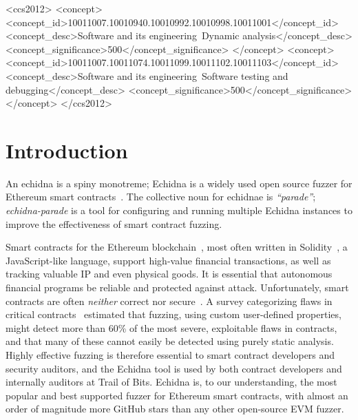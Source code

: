 \documentclass[sigconf]{acmart}
\begin{document}
\begin{CCSXML}
<ccs2012>
<concept>
<concept_id>10011007.10010940.10010992.10010998.10011001</concept_id>
<concept_desc>Software and its engineering~Dynamic analysis</concept_desc>
<concept_significance>500</concept_significance>
</concept>
<concept>
<concept_id>10011007.10011074.10011099.10011102.10011103</concept_id>
<concept_desc>Software and its engineering~Software testing and debugging</concept_desc>
<concept_significance>500</concept_significance>
</concept>
</ccs2012>
\end{CCSXML}




\maketitle

\section{Introduction}

An echidna is a spiny monotreme; Echidna is a widely used open source fuzzer for
Ethereum smart contracts~\cite{echidnaissta}.  The collective noun for
echidnae is \emph{``parade''}; \emph{echidna-parade} is a tool for configuring and
running multiple Echidna instances to improve the
effectiveness of smart contract fuzzing.

Smart contracts for the Ethereum blockchain~\cite{buterin2013whitepaper}, most often written in Solidity~\cite{wood2014yellow}, a
JavaScript-like language, support high-value financial transactions,
as well as tracking valuable IP and even physical goods.  It is essential that
autonomous financial programs be reliable and protected against
attack.  Unfortunately, smart contracts are often \emph{neither}
correct nor secure~\cite{SurveyAttacks}.  A survey categorizing flaws
in critical contracts~\cite{FC20} estimated that fuzzing, using custom
user-defined properties, might detect more than 60\% of the most
severe, exploitable flaws in contracts, and that many of these cannot easily
be detected using purely static analysis.  Highly effective fuzzing is
therefore essential to smart contract developers and security
auditors, and the Echidna tool is used by both contract developers
and internally auditors at Trail of Bits.  Echidna is, to our
understanding, the most popular and best supported fuzzer for Ethereum
smart contracts, with almost an order of magnitude more GitHub stars
than any other open-source EVM fuzzer.
\end{document}
